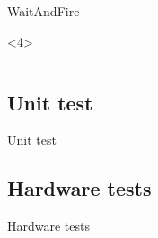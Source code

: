 \begin{frame}[fragile]{WaitAndFire}
\begin{onlyenv}<4>
\begin{center}
\begin{minipage}[H]{0.9\linewidth}
\begin{lstlisting}

\end{lstlisting} 
\end{minipage}
\end{center}
\end{onlyenv}
\end{frame}

\subsection{Unit test}
\begin{frame}{Unit test}
\begin{itemize}
\end{itemize}
\end{frame}

\subsection{Hardware tests}
\begin{frame}{Hardware tests}
\begin{itemize}
\end{itemize}
\end{frame}